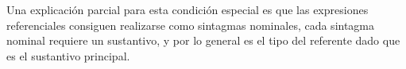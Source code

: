 Una explicaci\'on parcial para esta condici\'on especial es que las expresiones referenciales consiguen realizarse como sintagmas nominales,
cada sintagma nominal requiere un sustantivo, y por lo general es el tipo del referente dado que es el sustantivo principal.\\

